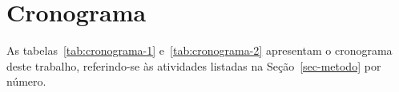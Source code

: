 
\section{Cronograma}
\label{sec-cronograma}

As tabelas~\ref{tab:cronograma-1} e~\ref{tab:cronograma-2} apresentam o cronograma deste trabalho, referindo-se às atividades listadas na Seção~\ref{sec-metodo} por número.


\begin{table}[htb]
	\centering
	\caption{Cronograma de Atividades do primeiro semestre.}
	\label{tab:cronograma-1}
\end{table}

